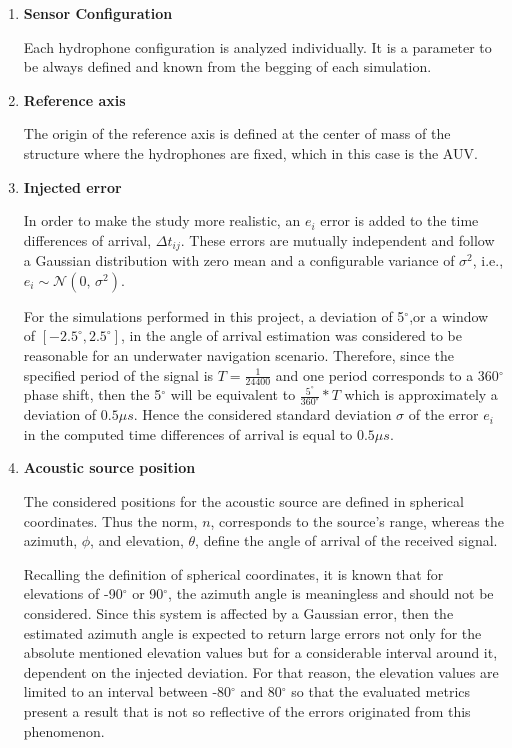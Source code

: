 \begin{enumerate}[label=\alph*)]
	\item \textbf{Sensor Configuration}  
	
	Each hydrophone configuration is analyzed individually. It is a parameter to be always defined and known from the begging of each simulation.
	
	\item \textbf{Reference axis}
	
	 The origin of the reference axis is defined at the center of mass of the structure where the hydrophones are fixed, which in this case is the AUV.
	
	\item \textbf{Injected error} 
	
	In order to make the study more realistic, an $e_i$ error is added to the time differences of arrival, $ \Delta t_{ij}$. These errors are mutually independent and follow a Gaussian distribution with zero mean and a configurable variance of $\sigma^{2}$, i.e., $e_i \sim \mathcal{N}(0,\,\sigma^{2})$. 
	
	 For the simulations performed in this project, a deviation of 5$^{\circ}$,or a window of $[-2.5^{\circ},2.5^{\circ}]$, in the angle of arrival estimation was considered to be reasonable for an underwater navigation scenario. Therefore, since the specified period of the signal is $T = \frac{1}{24400}$ and one period corresponds to a 360$^{\circ}$ phase shift, then the 5$^{\circ}$ will be equivalent to $\frac{5^{\circ}}{360^{\circ}}*T$ which is approximately a deviation of $0.5\mu s$. Hence the considered standard deviation $\sigma$ of the error $e_i$ in the computed time differences of arrival is equal to $0.5\mu s$.
	 
	 \item \textbf{Acoustic source position} 
	 
	 The considered positions for the acoustic source are defined in spherical coordinates. Thus the norm, $n$, corresponds to the source's range, whereas the azimuth, $\phi$, and elevation, $\theta$, define the angle of arrival of the received signal.
	 
	 Recalling the definition of spherical coordinates, it is known that for elevations of -90$^{\circ}$ or 90$^{\circ}$, the azimuth angle is meaningless and should not be considered. Since this system is affected by a Gaussian error, then the estimated azimuth angle is expected to return large errors not only for the absolute mentioned elevation values but for a considerable interval around it, dependent on the injected deviation. For that reason, the elevation values are limited to an interval between -80$^{\circ}$ and 80$^{\circ}$ so that the evaluated metrics present a result that is not so reflective of the errors originated from this phenomenon.
	 

\end{enumerate}
